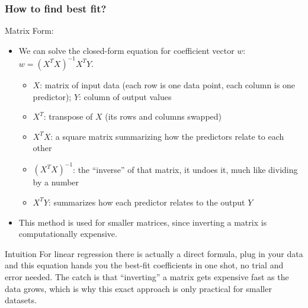 \begin{frame}[fragile]\frametitle{How to find best fit?}
Matrix Form:
\begin{itemize}
\item  We can solve the closed-form equation for coefficient vector $w$: $w = (X^T X)^{-1} X^T Y$.
	\begin{itemize}
	\item $X$: matrix of input data (each row is one data point, each column is one predictor); $Y$: column of output values
	\item $X^T$: transpose of $X$ (its rows and columns swapped)
	\item $X^T X$: a square matrix summarizing how the predictors relate to each other
	\item $(X^T X)^{-1}$: the ``inverse'' of that matrix, it undoes it, much like dividing by a number
	\item $X^T Y$: summarizes how each predictor relates to the output $Y$
	\end{itemize}
\item This method is used for smaller matrices, since inverting a matrix is computationally expensive.
\end{itemize}
\begin{block}{Intuition}
For linear regression there is actually a direct formula, plug in your data and this equation hands you the best-fit coefficients in one shot, no trial and error needed. The catch is that ``inverting'' a matrix gets expensive fast as the data grows, which is why this exact approach is only practical for smaller datasets.
\end{block}
\end{frame}

